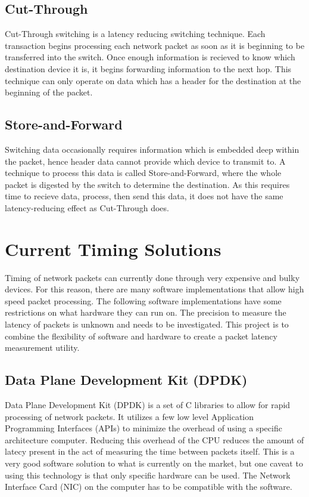 \subsection{Cut-Through}

\par Cut-Through switching is a latency reducing switching technique. 
Each transaction begins processing each network packet as soon as it is beginning to be transferred into the switch.
Once enough information is recieved to know which destination device it is, it begins forwarding information to the next hop.
This technique can only operate on data which has a header for the destination at the beginning of the packet.

\subsection{Store-and-Forward}

\par Switching data occasionally requires information which is embedded deep within the packet, hence header data cannot provide which device to transmit to.
A technique to process this data is called Store-and-Forward, where the whole packet is digested by the switch to determine the destination.
As this requires time to recieve data, process, then send this data, it does not have the same latency-reducing effect as Cut-Through does.

\section{Current Timing Solutions}

\par Timing of network packets can currently done through very expensive and bulky devices. 
For this reason, there are many software implementations that allow high speed packet processing.
The following software implementations have some restrictions on what hardware they can run on.
The precision to measure the latency of packets is unknown and needs to be investigated.
This project is to combine the flexibility of software and hardware to create a packet latency measurement utility.

\subsection{Data Plane Development Kit (DPDK)}

\par Data Plane Development Kit (DPDK) is a set of C libraries to allow for rapid processing of network packets.
It utilizes a few low level Application Programming Interfaces (APIs) to minimize the overhead of using a specific architecture computer.
Reducing this overhead of the CPU reduces the amount of latecy present in the act of measuring the time between packets itself.
This is a very good software solution to what is currently on the market, but one caveat to using this technology is that only specific hardware can be used.
The Network Interface Card (NIC) on the computer has to be compatible with the software.

